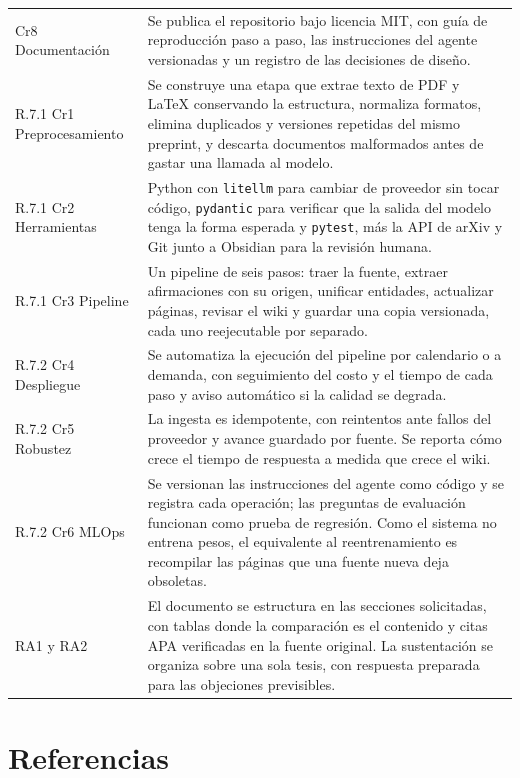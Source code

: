 \documentclass[11pt,letterpaper]{article}
\begin{document}
\begin{longtable}{L{2.9cm} L{11.4cm}}
Cr8 Documentación & Se publica el repositorio bajo licencia MIT, con guía de reproducción paso a paso, las instrucciones del agente versionadas y un registro de las decisiones de diseño. \\
R.7.1 Cr1 Preprocesamiento & Se construye una etapa que extrae texto de PDF y LaTeX conservando la estructura, normaliza formatos, elimina duplicados y versiones repetidas del mismo preprint, y descarta documentos malformados antes de gastar una llamada al modelo. \\
R.7.1 Cr2 Herramientas & Python con \texttt{litellm} para cambiar de proveedor sin tocar código, \texttt{pydantic} para verificar que la salida del modelo tenga la forma esperada y \texttt{pytest}, más la API de arXiv y Git junto a Obsidian para la revisión humana. \\
R.7.1 Cr3 Pipeline & Un pipeline de seis pasos: traer la fuente, extraer afirmaciones con su origen, unificar entidades, actualizar páginas, revisar el wiki y guardar una copia versionada, cada uno reejecutable por separado. \\
R.7.2 Cr4 Despliegue & Se automatiza la ejecución del pipeline por calendario o a demanda, con seguimiento del costo y el tiempo de cada paso y aviso automático si la calidad se degrada. \\
R.7.2 Cr5 Robustez & La ingesta es idempotente, con reintentos ante fallos del proveedor y avance guardado por fuente. Se reporta cómo crece el tiempo de respuesta a medida que crece el wiki. \\
R.7.2 Cr6 MLOps & Se versionan las instrucciones del agente como código y se registra cada operación; las preguntas de evaluación funcionan como prueba de regresión. Como el sistema no entrena pesos, el equivalente al reentrenamiento es recompilar las páginas que una fuente nueva deja obsoletas. \\
RA1 y RA2 & El documento se estructura en las secciones solicitadas, con tablas donde la comparación es el contenido y citas APA verificadas en la fuente original. La sustentación se organiza sobre una sola tesis, con respuesta preparada para las objeciones previsibles. \\
\end{longtable}
\normalsize

\section*{Referencias}
\end{document}
